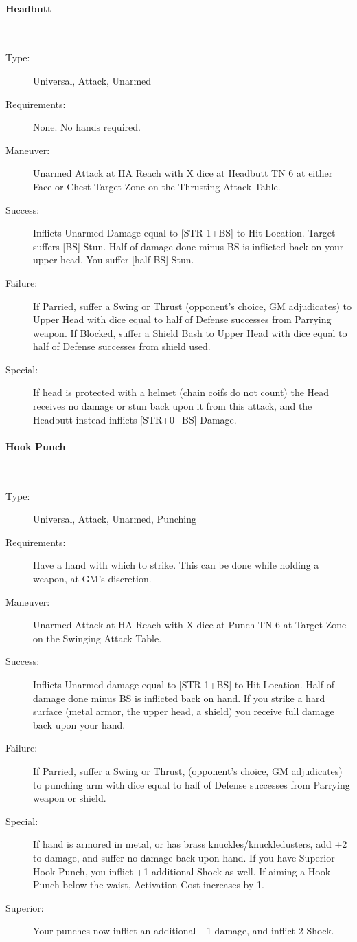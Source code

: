 \documentclass[oneside,11pt,english]{book}
\begin{document}
\paragraph{\large\label{man:Headbutt}Headbutt}---\quad{\large[X+1]}
\vspace{-10pt}\begin{description} 
\item [Type:] Universal, Attack, Unarmed 
\item [Requirements:] None. No hands required. 
\item [Maneuver:] Unarmed Attack at HA Reach with X dice at Headbutt TN 6 at
  either Face or Chest Target  
  Zone on the Thrusting Attack Table. 
\item [Success:] Inflicts Unarmed Damage equal to [STR-1+BS] to Hit Location.
  Target suffers [BS] Stun. Half of damage done minus BS is inflicted back on
  your upper head. You suffer [half BS] Stun.
\item [Failure:] If Parried, suffer a Swing or Thrust (opponent’s choice, GM
  adjudicates) to Upper Head with dice equal to half of Defense successes from
  Parrying weapon. If Blocked, suffer a Shield Bash to Upper Head with dice
  equal to half of Defense successes from shield used.  
\item [Special:] If head is protected with a helmet (chain coifs do not count)
  the Head receives no damage or stun back upon it from this attack, and the
  Headbutt instead inflicts [STR+0+BS] Damage.  
\end{description}
\paragraph{\large\label{man:Hook Punch}Hook Punch}---\quad{\large[X]}
\vspace{-10pt}\begin{description} 
\item [Type:] Universal, Attack, Unarmed, Punching 
\item [Requirements:] Have a hand with which to strike. This can be done while
  holding a weapon, at GM's discretion.  
\item [Maneuver:] Unarmed Attack at HA Reach with X dice at Punch TN 6 at Target
  Zone on the Swinging Attack Table.  
\item [Success:] Inflicts Unarmed damage equal to [STR-1+BS] to Hit Location.
  Half of damage done minus BS is inflicted back on hand. If you strike a hard
  surface (metal armor, the upper head, a shield) you receive full damage back
  upon your hand.  
\item [Failure:] If Parried, suffer a Swing or Thrust, (opponent’s choice, GM
  adjudicates) to punching arm with dice equal to half of Defense successes from
  Parrying weapon or shield.  
\item [Special:] If hand is armored in metal, or has brass
  knuckles/knuckledusters, add +2 to damage, and suffer no damage back upon
  hand. If you have Superior Hook Punch, you inflict +1 additional Shock as
  well. If aiming a Hook Punch below the waist, Activation Cost increases by 1.  
\item [Superior:] Your punches now inflict an additional +1 damage, and inflict 2 Shock. 
\end{description}
\end{document}
